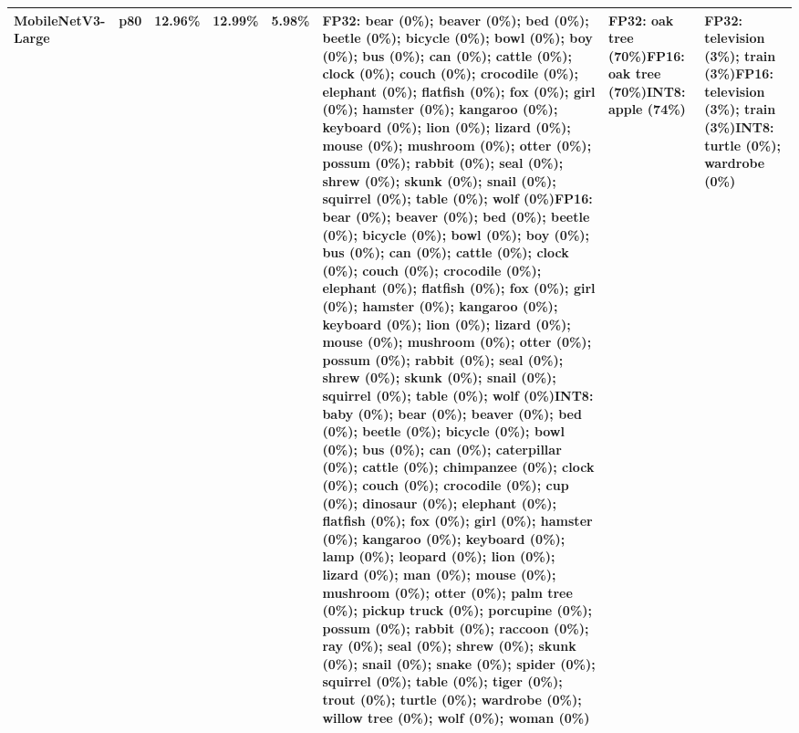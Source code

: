 \begin{longtable}{p{2.8cm} r r r r p{5.0cm} p{4.2cm} p{4.2cm}}
MobileNetV3-Large & p80 & 12.96\% & 12.99\% & 5.98\% & FP32: bear (0\%); beaver (0\%); bed (0\%); beetle (0\%); bicycle (0\%); bowl (0\%); boy (0\%); bus (0\%); can (0\%); cattle (0\%); clock (0\%); couch (0\%); crocodile (0\%); elephant (0\%); flatfish (0\%); fox (0\%); girl (0\%); hamster (0\%); kangaroo (0\%); keyboard (0\%); lion (0\%); lizard (0\%); mouse (0\%); mushroom (0\%); otter (0\%); possum (0\%); rabbit (0\%); seal (0\%); shrew (0\%); skunk (0\%); snail (0\%); squirrel (0\%); table (0\%); wolf (0\%)\newline FP16: bear (0\%); beaver (0\%); bed (0\%); beetle (0\%); bicycle (0\%); bowl (0\%); boy (0\%); bus (0\%); can (0\%); cattle (0\%); clock (0\%); couch (0\%); crocodile (0\%); elephant (0\%); flatfish (0\%); fox (0\%); girl (0\%); hamster (0\%); kangaroo (0\%); keyboard (0\%); lion (0\%); lizard (0\%); mouse (0\%); mushroom (0\%); otter (0\%); possum (0\%); rabbit (0\%); seal (0\%); shrew (0\%); skunk (0\%); snail (0\%); squirrel (0\%); table (0\%); wolf (0\%)\newline INT8: baby (0\%); bear (0\%); beaver (0\%); bed (0\%); beetle (0\%); bicycle (0\%); bowl (0\%); bus (0\%); can (0\%); caterpillar (0\%); cattle (0\%); chimpanzee (0\%); clock (0\%); couch (0\%); crocodile (0\%); cup (0\%); dinosaur (0\%); elephant (0\%); flatfish (0\%); fox (0\%); girl (0\%); hamster (0\%); kangaroo (0\%); keyboard (0\%); lamp (0\%); leopard (0\%); lion (0\%); lizard (0\%); man (0\%); mouse (0\%); mushroom (0\%); otter (0\%); palm tree (0\%); pickup truck (0\%); porcupine (0\%); possum (0\%); rabbit (0\%); raccoon (0\%); ray (0\%); seal (0\%); shrew (0\%); skunk (0\%); snail (0\%); snake (0\%); spider (0\%); squirrel (0\%); table (0\%); tiger (0\%); trout (0\%); turtle (0\%); wardrobe (0\%); willow tree (0\%); wolf (0\%); woman (0\%) & FP32: oak tree (70\%)\newline FP16: oak tree (70\%)\newline INT8: apple (74\%) & FP32: television (3\%); train (3\%)\newline FP16: television (3\%); train (3\%)\newline INT8: turtle (0\%); wardrobe (0\%) \\ \hline

\end{longtable}
